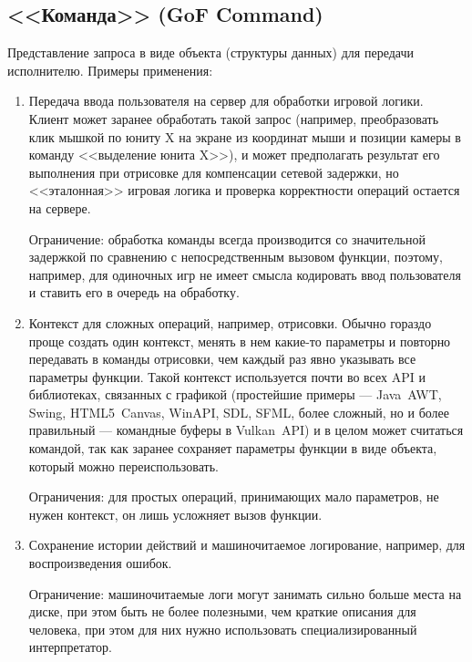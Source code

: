 \subsection*{<<Команда>> (GoF Command)}
Представление запроса в виде объекта (структуры данных) для передачи исполнителю.
Примеры применения:
\begin{enumerate}
    \item Передача ввода пользователя на сервер для обработки игровой логики.
    Клиент может заранее обработать такой запрос (например, преобразовать клик мышкой по юниту X
    на экране из координат мыши и позиции камеры в команду <<выделение юнита X>>),
    и может предполагать результат его выполнения при отрисовке для компенсации сетевой задержки,
    но <<эталонная>> игровая логика и проверка корректности операций остается на сервере.

    Ограничение: обработка команды всегда производится со значительной задержкой
    по сравнению с непосредственным вызовом функции, поэтому, например,
    для одиночных игр не имеет смысла кодировать ввод пользователя и ставить его в очередь на обработку.

    \item Контекст для сложных операций, например, отрисовки.
    Обычно гораздо проще создать один контекст, менять в нем какие-то параметры и
    повторно передавать в команды отрисовки, чем каждый раз явно указывать все параметры функции.
    Такой контекст используется почти во всех API и библиотеках, связанных с графикой
    (простейшие примеры --- Java~AWT, Swing, HTML5~Canvas, WinAPI, SDL, SFML,
    более сложный, но и более правильный --- командные буферы в Vulkan~API)
    и в целом может считаться командой, так как заранее сохраняет параметры функции в виде объекта,
    который можно переиспользовать.

    Ограничения: для простых операций, принимающих мало параметров, не нужен контекст,
    он лишь усложняет вызов функции.

    \item Сохранение истории действий и машиночитаемое логирование,
    например, для воспроизведения ошибок.

    Ограничение: машиночитаемые логи могут занимать сильно больше места на диске,
    при этом быть не более полезными, чем краткие описания для человека,
    при этом для них нужно использовать специализированный интерпретатор.
\end{enumerate}

